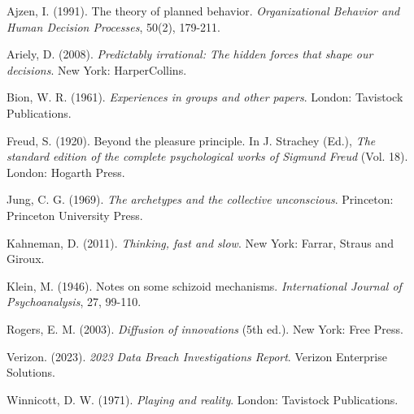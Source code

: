 \documentclass[10pt, twocolumn]{article}
\begin{document}
\begin{thebibliography}{99}

Ajzen, I. (1991). The theory of planned behavior. \textit{Organizational Behavior and Human Decision Processes}, 50(2), 179-211.

Ariely, D. (2008). \textit{Predictably irrational: The hidden forces that shape our decisions}. New York: HarperCollins.

Bion, W. R. (1961). \textit{Experiences in groups and other papers}. London: Tavistock Publications.

Freud, S. (1920). Beyond the pleasure principle. In J. Strachey (Ed.), \textit{The standard edition of the complete psychological works of Sigmund Freud} (Vol. 18). London: Hogarth Press.

Jung, C. G. (1969). \textit{The archetypes and the collective unconscious}. Princeton: Princeton University Press.

Kahneman, D. (2011). \textit{Thinking, fast and slow}. New York: Farrar, Straus and Giroux.

Klein, M. (1946). Notes on some schizoid mechanisms. \textit{International Journal of Psychoanalysis}, 27, 99-110.

Rogers, E. M. (2003). \textit{Diffusion of innovations} (5th ed.). New York: Free Press.

Verizon. (2023). \textit{2023 Data Breach Investigations Report}. Verizon Enterprise Solutions.

Winnicott, D. W. (1971). \textit{Playing and reality}. London: Tavistock Publications.

\end{thebibliography}
\end{document}
